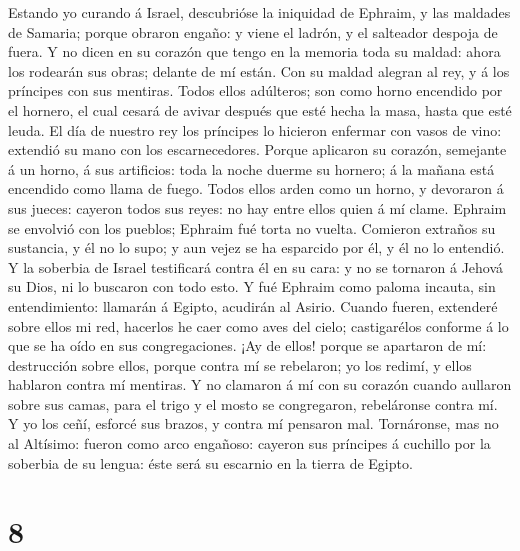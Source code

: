  Estando yo curando á Israel, descubrióse la iniquidad de
Ephraim, y las maldades de Samaria; porque obraron engaño: y viene el
ladrón, y el salteador despoja de fuera.  Y no dicen en su
corazón que tengo en la memoria toda su maldad: ahora los rodearán sus
obras; delante de mí están.  Con su maldad alegran al rey, y
á los príncipes con sus mentiras.  Todos ellos adúlteros;
son como horno encendido por el hornero, el cual cesará de avivar
después que esté hecha la masa, hasta que esté leuda.  El
día de nuestro rey los príncipes lo hicieron enfermar con vasos de vino:
extendió su mano con los escarnecedores.  Porque aplicaron
su corazón, semejante á un horno, á sus artificios: toda la noche duerme
su hornero; á la mañana está encendido como llama de fuego. 
Todos ellos arden como un horno, y devoraron á sus jueces: cayeron todos
sus reyes: no hay entre ellos quien á mí clame.  Ephraim se
envolvió con los pueblos; Ephraim fué torta no vuelta. 
Comieron extraños su sustancia, y él no lo supo; y aun vejez se ha
esparcido por él, y él no lo entendió.  Y la soberbia de
Israel testificará contra él en su cara: y no se tornaron á Jehová su
Dios, ni lo buscaron con todo esto.  Y fué Ephraim como
paloma incauta, sin entendimiento: llamarán á Egipto, acudirán al
Asirio.  Cuando fueren, extenderé sobre ellos mi red,
hacerlos he caer como aves del cielo; castigarélos conforme á lo que se
ha oído en sus congregaciones.  ¡Ay de ellos! porque se
apartaron de mí: destrucción sobre ellos, porque contra mí se rebelaron;
yo los redimí, y ellos hablaron contra mí mentiras.  Y no
clamaron á mí con su corazón cuando aullaron sobre sus camas, para el
trigo y el mosto se congregaron, rebeláronse contra mí.  Y
yo los ceñí, esforcé sus brazos, y contra mí pensaron mal. 
Tornáronse, mas no al Altísimo: fueron como arco engañoso: cayeron sus
príncipes á cuchillo por la soberbia de su lengua: éste será su escarnio
en la tierra de Egipto.

\hypertarget{section-7}{%
\section{8}\label{section-7}}

